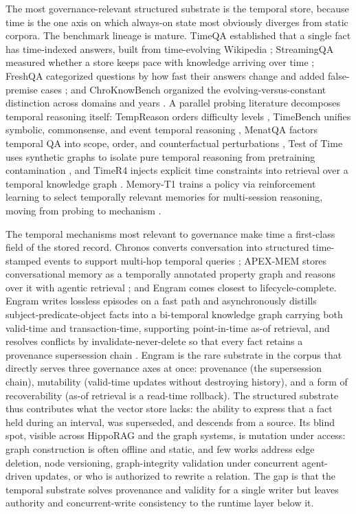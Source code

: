 The most governance-relevant structured substrate is the temporal store, because time is the one axis on which always-on state most obviously diverges from static corpora. The benchmark lineage is mature. TimeQA established that a single fact has time-indexed answers, built from time-evolving Wikipedia \citep{chen2021timeqa}; StreamingQA measured whether a store keeps pace with knowledge arriving over time \citep{liska2022streamingqa}; FreshQA categorized questions by how fast their answers change and added false-premise cases \citep{vu2023freshllms}; and ChroKnowBench organized the evolving-versus-constant distinction across domains and years \citep{park2024chroknowledge}. A parallel probing literature decomposes temporal reasoning itself: TempReason orders difficulty levels \citep{tan2023tempreason}, TimeBench unifies symbolic, commonsense, and event temporal reasoning \citep{chu2023timebench}, MenatQA factors temporal QA into scope, order, and counterfactual perturbations \citep{wei2023menatqa}, Test of Time uses synthetic graphs to isolate pure temporal reasoning from pretraining contamination \citep{fatemi2024testoftime}, and TimeR4 injects explicit time constraints into retrieval over a temporal knowledge graph \citep{qian2024timer4}. Memory-T1 trains a policy via reinforcement learning to select temporally relevant memories for multi-session reasoning, moving from probing to mechanism \citep{du2025memoryt1}.

The temporal mechanisms most relevant to governance make time a first-class field of the stored record. Chronos converts conversation into structured time-stamped events to support multi-hop temporal queries \citep{sen2026chronos}; APEX-MEM stores conversational memory as a temporally annotated property graph and reasons over it with agentic retrieval \citep{banerjee2026apexmem}; and Engram comes closest to lifecycle-complete. Engram writes lossless episodes on a fast path and asynchronously distills subject-predicate-object facts into a bi-temporal knowledge graph carrying both valid-time and transaction-time, supporting point-in-time as-of retrieval, and resolves conflicts by invalidate-never-delete so that every fact retains a provenance supersession chain \citep{wang2026engram}. Engram is the rare substrate in the corpus that directly serves three governance axes at once: provenance (the supersession chain), mutability (valid-time updates without destroying history), and a form of recoverability (as-of retrieval is a read-time rollback). The structured substrate thus contributes what the vector store lacks: the ability to express that a fact held during an interval, was superseded, and descends from a source. Its blind spot, visible across HippoRAG and the graph systems, is mutation under access: graph construction is often offline and static, and few works address edge deletion, node versioning, graph-integrity validation under concurrent agent-driven updates, or who is authorized to rewrite a relation. The gap is that the temporal substrate solves provenance and validity for a single writer but leaves authority and concurrent-write consistency to the runtime layer below it.

